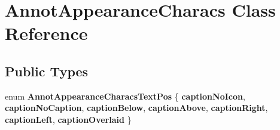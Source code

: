 \hypertarget{class_annot_appearance_characs}{}\section{Annot\+Appearance\+Characs Class Reference}
\label{class_annot_appearance_characs}
\subsection*{Public Types}
\begin{DoxyCompactItemize}
\item 
\mbox{\label{class_annot_appearance_characs_ad58fb10ee50670034eeb0b0848a2c4f7}} 
enum {\bfseries Annot\+Appearance\+Characs\+Text\+Pos} \{ \newline
{\bfseries caption\+No\+Icon}, 
{\bfseries caption\+No\+Caption}, 
{\bfseries caption\+Below}, 
{\bfseries caption\+Above}, 
\newline
{\bfseries caption\+Right}, 
{\bfseries caption\+Left}, 
{\bfseries caption\+Overlaid}
 \}
\end{DoxyCompactItemize}
